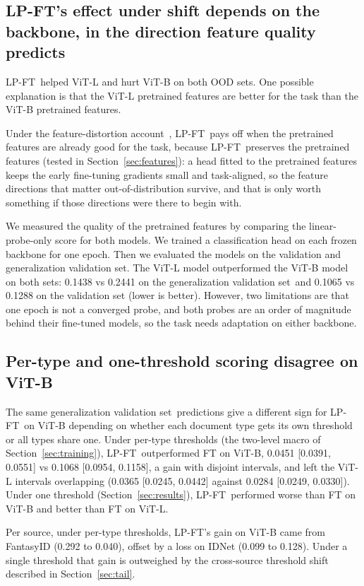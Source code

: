 \documentclass[10pt]{article}
\newcommand{\ci}[2]{{\footnotesize[#1, #2]}}
\newcommand{\lpft}{LP-FT}
\newcommand{\genval}{generalization validation set}
\begin{document}
\subsection{\lpft's effect under shift depends on the backbone, in the direction feature quality predicts}
\lpft\ helped ViT-L and hurt ViT-B on both OOD sets. One possible explanation is that the ViT-L pretrained features are better for the task than the ViT-B pretrained features.

Under the feature-distortion account~\citep{kumar2022finetuning}, \lpft\ pays off when the pretrained features are already good for the task, because \lpft\ preserves the pretrained features (tested in Section~\ref{sec:features}): a head fitted to the pretrained features keeps the early fine-tuning gradients small and task-aligned, so the feature directions that matter out-of-distribution survive, and that is only worth something if those directions were there to begin with.

We measured the quality of the pretrained features by comparing the linear-probe-only score for both models. We trained a classification head on each frozen backbone for one epoch. Then we evaluated the models on the validation and \genval. The ViT-L model outperformed the ViT-B model on both sets: 0.1438 vs 0.2441 on the \genval\ and 0.1065 vs 0.1288 on the validation set (lower is better). However, two limitations are that one epoch is not a converged probe, and both probes are an order of magnitude behind their fine-tuned models, so the task needs adaptation on either backbone.

\subsection{Per-type and one-threshold scoring disagree on ViT-B}
\label{sec:aggregation}
The same \genval\ predictions give a different sign for \lpft\ on ViT-B depending on whether each document type gets its own threshold or all types share one. Under per-type thresholds (the two-level macro of Section~\ref{sec:training}), \lpft\ outperformed FT on ViT-B, 0.0451 \ci{0.0391}{0.0551} vs 0.1068 \ci{0.0954}{0.1158}, a gain with disjoint intervals, and left the ViT-L intervals overlapping (0.0365 \ci{0.0245}{0.0442} against 0.0284 \ci{0.0249}{0.0330}). Under one threshold (Section~\ref{sec:results}), \lpft\ performed worse than FT on ViT-B and better than FT on ViT-L.

Per source, under per-type thresholds, \lpft's gain on ViT-B came from FantasyID (0.292 to 0.040), offset by a loss on IDNet (0.099 to 0.128). Under a single threshold that gain is outweighed by the cross-source threshold shift described in Section~\ref{sec:tail}.
\end{document}
